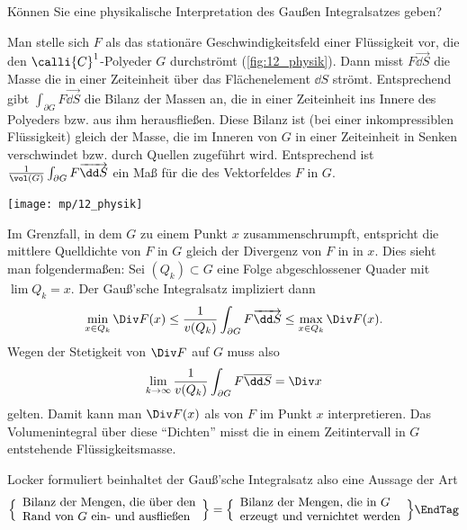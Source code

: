 \begin{frage}\label{12_quelldichte}
  Können Sie eine physikalische Interpretation des 
  Gauß\sch en Integralsatzes geben?
\end{frage}

\begin{antwort}
  Man stelle sich $F$ als das stationäre Geschwindigkeitsfeld einer 
  Flüssigkeit vor, die den $\calli{C}^1$-Polyeder 
  $G$ durchströmt (\sieheAbbildung\ref{fig:12_physik}). 
  Dann misst $F \overrightarrow {\dd S}$ die Masse 
  die in einer Zeiteinheit über das Flächenelement ${\dd S}$ strömt. 
  Entsprechend gibt $\int_{\partial G} F\overrightarrow{\dd S}$ 
  die Bilanz der Massen an, die in einer 
  Zeiteinheit ins Innere des Polyeders bzw. aus ihm herausfließen. 
  Diese Bilanz ist (bei einer inkompressiblen Flüssigkeit) gleich der 
  Masse, die im Inneren von $G$ in einer Zeiteinheit in Senken 
  verschwindet bzw. durch Quellen zugeführt wird. Entsprechend ist 
  $\frac{1}{\vol(G)} \int_{\partial G} F \overrightarrow{\dd S}$ ein Maß 
  für die  des Vektorfeldes $F$ in $G$. 

  \begin{center}
    \texttt{[image: mp/12\_physik]}
    \label{fig:12_physik}
  \end{center}


  Im Grenzfall, in dem $G$ zu einem Punkt $x$ zusammenschrumpft, 
  entspricht die mittlere Quelldichte von $F$ in $G$ gleich der Divergenz 
  von $F$ in in $x$. Dies sieht man folgendermaßen: Sei $(Q_k)\subset G$ 
  eine Folge abgeschlossener Quader mit $\lim Q_k = x$. Der Gauß'sche 
  Integralsatz impliziert dann  
  \[
  \min_{x\in Q_k} \Div F(x) \le 
  \frac{1}{v(Q_k)} \int_{\partial G} F\overrightarrow{\dd S} \le 
  \max_{x\in Q_k} \Div F(x).
  \] 
  Wegen der Stetigkeit von $\Div F$ auf $G$ muss also  
  \[
  \lim_{k\to\infty} \frac{1}{v(Q_k)}\int_{\partial G} 
  F \overline{\dd S}=\Div x
  \]
  gelten. 
  Damit kann man $\Div F(x)$ als  von $F$ im Punkt $x$ 
  interpretieren. Das Volumenintegral über diese "`Dichten"' misst die 
  in einem Zeitintervall in $G$ entstehende Flüssigkeitsmasse. 

  Locker formuliert beinhaltet der Gauß'sche 
  Integralsatz also eine Aussage der Art
  \[
  \Big\{
  \begin{array}{l} \text{Bilanz der Mengen, die über den} \\
    \text{Rand von $G$ ein- und ausfließen} \end{array}
  \Big\}
  = 
  \Big\{
  \begin{array}{l} \text{Bilanz der Mengen, die in $G$} \\
    \text{erzeugt und vernichtet werden} \end{array}
  \Big\} \EndTag
  \] 
\end{antwort} 



